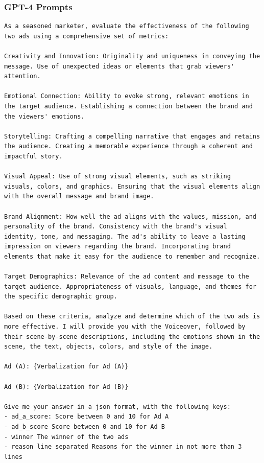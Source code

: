 \subsubsection{GPT-4 Prompts}
\begin{lstlisting}[caption={GPT-4 Prompt to calculate preference between Real Ad (A) and Generated Ad (B)},frame=single,breaklines=true,basicstyle=\tiny, label={lst:ad-quality-preference-prompt}]
As a seasoned marketer, evaluate the effectiveness of the following two ads using a comprehensive set of metrics:

Creativity and Innovation: Originality and uniqueness in conveying the message. Use of unexpected ideas or elements that grab viewers' attention.

Emotional Connection: Ability to evoke strong, relevant emotions in the target audience. Establishing a connection between the brand and the viewers' emotions.

Storytelling: Crafting a compelling narrative that engages and retains the audience. Creating a memorable experience through a coherent and impactful story.

Visual Appeal: Use of strong visual elements, such as striking visuals, colors, and graphics. Ensuring that the visual elements align with the overall message and brand image.

Brand Alignment: How well the ad aligns with the values, mission, and personality of the brand. Consistency with the brand's visual identity, tone, and messaging. The ad's ability to leave a lasting impression on viewers regarding the brand. Incorporating brand elements that make it easy for the audience to remember and recognize.

Target Demographics: Relevance of the ad content and message to the target audience. Appropriateness of visuals, language, and themes for the specific demographic group.

Based on these criteria, analyze and determine which of the two ads is more effective. I will provide you with the Voiceover, followed by their scene-by-scene descriptions, including the emotions shown in the scene, the text, objects, colors, and style of the image.

Ad (A): {Verbalization for Ad (A)}

Ad (B): {Verbalization for Ad (B)}

Give me your answer in a json format, with the following keys:
- ad_a_score: Score between 0 and 10 for Ad A
- ad_b_score Score between 0 and 10 for Ad B
- winner The winner of the two ads
- reason line separated Reasons for the winner in not more than 3 lines
\end{lstlisting}



